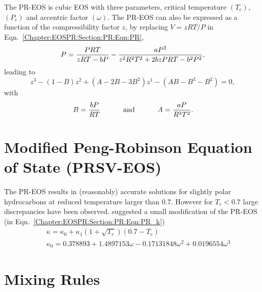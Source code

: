 The PR-EOS is cubic EOS with three parameters, critical temperature $\left(T_{c}\right)$, $\left(P_{c}\right)$ and accentric factor $\left(\omega\right)$. The PR-EOS can also be expressed as a function of the compressibility factor $z$, by replacing $V=zRT/P$ in Eqn.~\ref{Chapter:EOSPR:Section:PR:Eqn:PR},
   \begin{displaymath}
           P = \displaystyle\frac{PRT}{zRT-bP} - \displaystyle\frac{aP^{2}}{z^{2}R^{2}T^{2} +2bzPRT-b^{2}P^{2}},
   \end{displaymath} 
leading to 
   \begin{equation}
      z^{3} -\left(1-B\right)z^{2} + \left(A-2B-3B^{2}\right)z^{1} - \left(AB -B^{3} - B^{2}\right) = 0,\label{Chapter:EOSPR:Section:PR:Eqn:CubicPR_Z}
   \end{equation}
with
\begin{equation}
B = \displaystyle\frac{bP}{RT} \hspace{1cm}\text{ and }\hspace{1cm} A =\displaystyle\frac{aP}{R^{2}T^{2}}.\label{Chapter:EOSPR:Section:PR:Eqn:CubicPR_Z_Parameters}
\end{equation}

\section{Modified Peng-Robinson Equation of State (PRSV-EOS)}\label{Chapter:EOSPR:Section:PRSV}
The PR-EOS results in (reasonably) accurate solutions for slightly polar hydrocarbons at reduced temperature larger than $0.7$. However for $T_{r}<0.7$ large discrepancies have been observed. \citet[PRSV-EOS]{stryjek_1986} suggested a small modification of the PR-EOS (\ie in Eqn.~\ref{Chapter:EOSPR:Section:PR:Eqn:PR_k})
   \begin{eqnarray}
     && \kappa = \kappa_{0} + \kappa_{1}\left(1+\sqrt{T_{r}}\right)\left(0.7-T_{r}\right) \\
     && \kappa_{0} = 0.378893 + 1.4897153\omega - 0.17131848\omega^{2} + 0.0196554\omega^{3} \nonumber
   \end{eqnarray}

\section{Mixing Rules}\label{Chapter:EOSPR:Section:MixRules}


